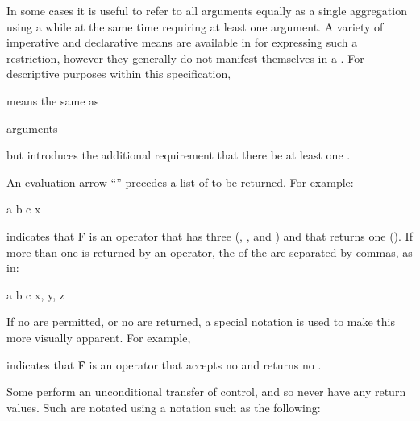 
In some cases it is useful to refer to all arguments equally as a single
aggregation using a  while at the same time
requiring at least one argument.  A variety of imperative and
declarative means are available in  for expressing such a
restriction, however they generally do not manifest themselves in a
.  For descriptive purposes within this specification,

 {{\rest} }

\noindent means the same as

 {{\rest} arguments}

\noindent but introduces the additional requirement that there be 
at least one .

\endsubsubsubsection%


An evaluation arrow ``{\EV}'' precedes a list of  to be returned.
For example:

 {a b c} {x}

\noindent indicates that \f{F} is an operator that has three 
(\ie {}, , and ) and that returns one  (\ie {}).
If more than one  is returned by an operator, the  of the
 are separated by commas, as in:

 {a b c} {x, y, z}


If no  are permitted, or no  are returned, 
a special notation is used to make this more visually apparent.  For example,

 {\noargs} {\novalues}

indicates that \f{F} is an operator that accepts no  and returns
no .

\endsubsubsubsubsection%


Some  perform an unconditional transfer of control, and
so never have any return values.  Such  are notated using
a notation such as the following:

